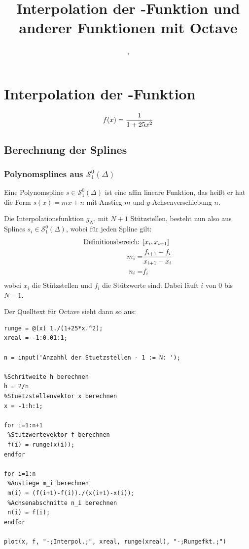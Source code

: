 \documentclass[ngerman,a4paper]{texmf/tex/latex/mathscript/mathscript}
\title{\textbf{Interpolation der \person{Runge}-Funktion und anderer Funktionen mit Octave}}
\author{\person{Henry Haustein}, \person{Lars Ortscheidt}}
\begin{document}
\maketitle
	
\tableofcontents
\pagebreak
	
\section{Interpolation der -Funktion}	
	\begin{align}
		f(x) = \frac{1}{1+25x^2}\notag
	\end{align}
	
	\subsection{Berechnung der Splines}
	\subsubsection{Polynomsplines aus $\mathcal{S}_1^0(\Delta)$}
	
	Eine Polynomspline $s\in\mathcal{S}_1^0(\Delta)$ ist eine affin lineare Funktion, das heißt er hat die Form $s(x)=mx+n$ mit Anstieg $m$ und $y$-Achsenverschiebung $n$. 
	
	Die Interpolationsfunktion $g_N$, mit $N+1$ Stützstellen, besteht nun also aus Splines $s_i\in\mathcal{S}_1^0(\Delta)$, wobei für jeden Spline gilt:
	\begin{align}
		\text{Definitionsbereich: } & [x_i,x_{i+1}] \notag \\
		m_i =& \frac{f_{i+1}-f_i}{x_{i+1}-x_i}\notag \\
		n_i =& f_i \notag
	\end{align} 
	wobei $x_i$ die Stützstellen und $f_i$ die Stützwerte sind. Dabei läuft $i$ von $0$ bis $N-1$.
	
	Der Quelltext für Octave sieht dann so aus:
\begin{lstlisting}
runge = @(x) 1./(1+25*x.^2);
xreal = -1:0.01:1;

n = input('Anzahhl der Stuetzstellen - 1 := N: ');

%Schritweite h berechnen
h = 2/n
%Stuetzstellenvektor x berechnen
x = -1:h:1;

for i=1:n+1
 %Stutzwertevektor f berechnen
 f(i) = runge(x(i));
endfor

for i=1:n
 %Anstiege m_i berechnen
 m(i) = (f(i+1)-f(i))./(x(i+1)-x(i));
 %Achsenabschnitte n_i berechnen
 n(i) = f(i);
endfor

plot(x, f, "-;Interpol.;", xreal, runge(xreal), "-;Rungefkt.;")
\end{lstlisting}
\end{document}
